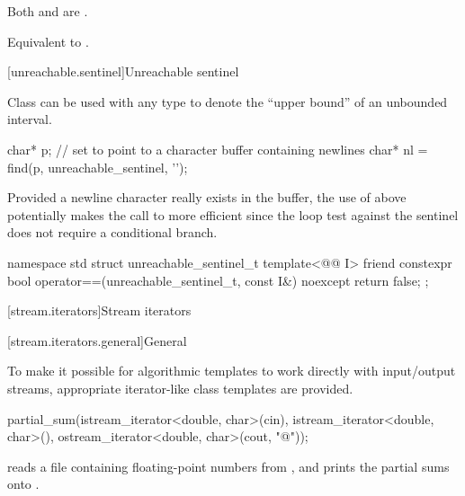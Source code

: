 \begin{itemdescr}
\pnum
\expects
Both  and  are .

\pnum
\effects
Equivalent to .
\end{itemdescr}

[unreachable.sentinel]{Unreachable sentinel}

%
\pnum
Class  can be used with
any  type
to denote the ``upper bound'' of an unbounded interval.

\pnum
\begin{example}
\begin{codeblock}
char* p;
// set  to point to a character buffer containing newlines
char* nl = find(p, unreachable_sentinel, '\n');
\end{codeblock}

Provided a newline character really exists in the buffer, the use of
 above potentially makes the call to  more
efficient since the loop test against the sentinel does not require a
conditional branch.
\end{example}

%
\begin{codeblock}
namespace std {
  struct unreachable_sentinel_t {
    template<@@ I>
      friend constexpr bool operator==(unreachable_sentinel_t, const I&) noexcept
      { return false; }
  };
}
\end{codeblock}

[stream.iterators]{Stream iterators}

[stream.iterators.general]{General}

\pnum
To make it possible for algorithmic templates to work directly with input/output streams, appropriate
iterator-like
class templates
are provided.

\begin{example}
\begin{codeblock}
partial_sum(istream_iterator<double, char>(cin),
  istream_iterator<double, char>(),
  ostream_iterator<double, char>(cout, "@\textbackslash@n"));
\end{codeblock}

reads a file containing floating-point numbers from
,
and prints the partial sums onto
.
\end{example}

